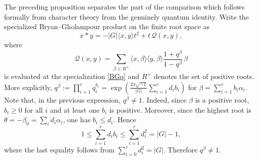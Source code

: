 \documentclass[a4paper,reqno]{amsart}
\theoremstyle{plain} %
\theoremstyle{definition} %
\theoremstyle{remark} %
\newcommand{\1}{\mathds{1}}   %
\begin{document}
The preceding proposition separates the part of the comparison which follows
formally from character theory from the genuinely quantum identity. Write the
specialized Bryan--Gholampour product on the finite root space as
\begin{equation}\label{BG-product-Q}
x*y=-|G|\langle x,y\rangle t^2+t\,\mathcal Q(x,y),
\end{equation}
where
\begin{equation}\label{def:QBG}
\mathcal Q(x,y)=
\sum_{\beta\in R^+}
\langle x,\beta\rangle\langle y,\beta\rangle
\frac{1+q^\beta}{1-q^\beta}\,\beta
\end{equation}
is evaluated at the specialization \eqref{BGq} and $R^+$ denotes the set of positive roots. 
More explicitly, $q^\beta:=\prod_{i=1}^r q_i^{b_i}= \exp \left( {\frac{2\pi \sqrt{-1}}{|G|}\sum_{i=1}^rd_i b_i}\right)$ 
for $\beta=\sum_{i=1}^r b_i\alpha_i$.
Note that, in the previous expression, $q^\beta \not=1$. Indeed, 
since \(\beta\) is a  positive root, \(b_i\ge 0\) for all \(i\) and at least one \(b_i\) is positive. 
Moreover, since the highest root is \(\theta= -\beta_0 = \sum_i d_i\alpha_i\), one has \(b_i\le d_i\). Hence
$$
1\le \sum_{i=1}^r d_i b_i\le \sum_{i=1}^r d_i^2=|G|-1, 
$$
where the last equality follows from \(\sum_{i=0}^r d_i^2=|G|\). Therefore \(q^\beta\ne1\).
\end{document}
